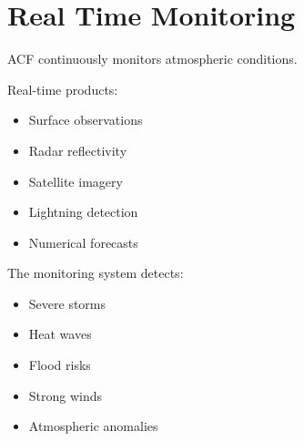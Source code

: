 \section{Real Time Monitoring}


ACF continuously monitors atmospheric conditions.



Real-time products:


\begin{itemize}

\item Surface observations

\item Radar reflectivity

\item Satellite imagery

\item Lightning detection

\item Numerical forecasts

\end{itemize}



The monitoring system detects:


\begin{itemize}

\item Severe storms

\item Heat waves

\item Flood risks

\item Strong winds

\item Atmospheric anomalies

\end{itemize}

